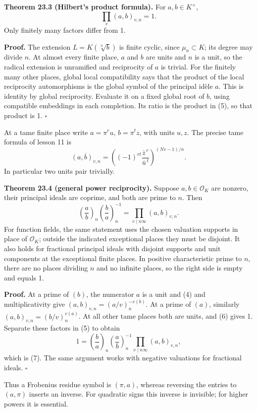 \documentclass[11pt,a4paper]{article}
\begin{document}
\textbf{Theorem 23.3 (Hilbert's product formula).} For
\(a,b\in K^\times\), \[
\prod_v(a,b)_{v,n}=1.
\tag{5}
\] Only finitely many factors differ from 1.

\textbf{Proof.} The extension \(L=K(\sqrt[n]b)\) is finite cyclic, since
\(\mu_n\subset K\); its degree may divide \(n\). At almost every finite
place, \(a\) and \(b\) are units and \(n\) is a unit, so the radical
extension is unramified and reciprocity of \(a\) is trivial. For the
finitely many other places, global local compatibility says that the
product of the local reciprocity automorphisms is the global symbol of
the principal idèle \(a\). This is identity by global reciprocity.
Evaluate it on a fixed global root of \(b\), using compatible embeddings
in each completion. Its ratio is the product in (5), so that product is
1. \(\square\)

At a tame finite place write \(a=\pi^r u\), \(b=\pi^t z\), with units
\(u,z\). The precise tame formula of lesson 11 is \[
\overline{(a,b)_{v,n}}
=\left((-1)^{rt}\frac{\bar z^{\,r}}{\bar u^{\,t}}\right)^{(Nv-1)/n}.
\tag{6}
\] In particular two units pair trivially.

\textbf{Theorem 23.4 (general power reciprocity).} Suppose
\(a,b\in\mathcal O_K\) are nonzero, their principal ideals are coprime,
and both are prime to \(n\). Then \[
\left(\frac a b\right)_n
\left(\frac b a\right)_n^{-1}
=\prod_{v\mid n\infty}(a,b)_{v,n}.
\tag{7}
\] For function fields, the same statement uses the chosen valuation
supports in place of \(\mathcal O_K\); outside the indicated exceptional
places they must be disjoint. It also holds for fractional principal
ideals with disjoint supports and unit components at the exceptional
finite places. In positive characteristic prime to \(n\), there are no
places dividing \(n\) and no infinite places, so the right side is empty
and equals 1.

\textbf{Proof.} At a prime of \((b)\), the numerator \(a\) is a unit and
(4) and multiplicativity give \((a,b)_{v,n}=(a/v)_n^{-v(b)}\). At a
prime of \((a)\), similarly \((a,b)_{v,n}=(b/v)_n^{v(a)}\). At all other
tame places both are units, and (6) gives 1. Separate these factors in
(5) to obtain \[
1=\left(\frac b a\right)_n
  \left(\frac a b\right)_n^{-1}
  \prod_{v\mid n\infty}(a,b)_{v,n},
\] which is (7). The same argument works with negative valuations for
fractional ideals. \(\square\)

Thus a Frobenius residue symbol is \((\pi,a)\), whereas reversing the
entries to \((a,\pi)\) inserts an inverse. For quadratic signs this
inverse is invisible; for higher powers it is essential.
\end{document}
